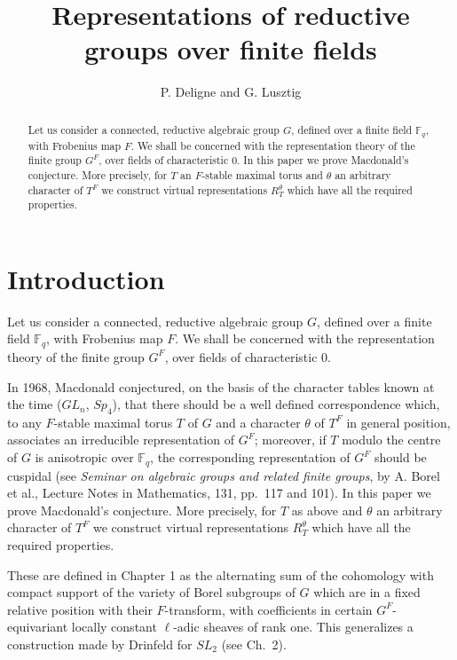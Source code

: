 \documentclass[11pt]{amsart}
\theoremstyle{plain}
\theoremstyle{remark}
\begin{document}
\title{Representations of reductive groups over finite fields}
\author{P. Deligne and G. Lusztig}
\begin{abstract}
Let us consider a connected, reductive algebraic group $G$, defined over a finite field $\mathbb{F}_q$, with Frobenius map $F$. We shall be concerned with the representation theory of the finite group $G^F$, over fields of characteristic $0$. In this paper we prove Macdonald's conjecture. More precisely, for $T$ an $F$-stable maximal torus and $\theta$ an arbitrary character of $T^F$ we construct virtual representations $R_T^\theta$ which have all the required properties.
\end{abstract}
\maketitle

\section*{Introduction}

Let us consider a connected, reductive algebraic group $G$, defined over a finite field $\mathbb{F}_q$, with Frobenius map $F$. We shall be concerned with the representation theory of the finite group $G^F$, over fields of characteristic $0$.

In 1968, Macdonald conjectured, on the basis of the character tables known at the time ($GL_n$, $Sp_4$), that there should be a well defined correspondence which, to any $F$-stable maximal torus $T$ of $G$ and a character $\theta$ of $T^F$ in general position, associates an irreducible representation of $G^F$; moreover, if $T$ modulo the centre of $G$ is anisotropic over $\mathbb{F}_q$, the corresponding representation of $G^F$ should be cuspidal (see \textit{Seminar on algebraic groups and related finite groups}, by A. Borel et al., Lecture Notes in Mathematics, 131, pp.\ 117 and 101). In this paper we prove Macdonald's conjecture. More precisely, for $T$ as above and $\theta$ an arbitrary character of $T^F$ we construct virtual representations $R_T^\theta$ which have all the required properties.

These are defined in Chapter 1 as the alternating sum of the cohomology with compact support of the variety of Borel subgroups of $G$ which are in a fixed relative position with their $F$-transform, with coefficients in certain $G^F$-equivariant locally constant $\ell$-adic sheaves of rank one. This generalizes a construction made by Drinfeld for $SL_2$ (see Ch.\ 2).
\end{document}
